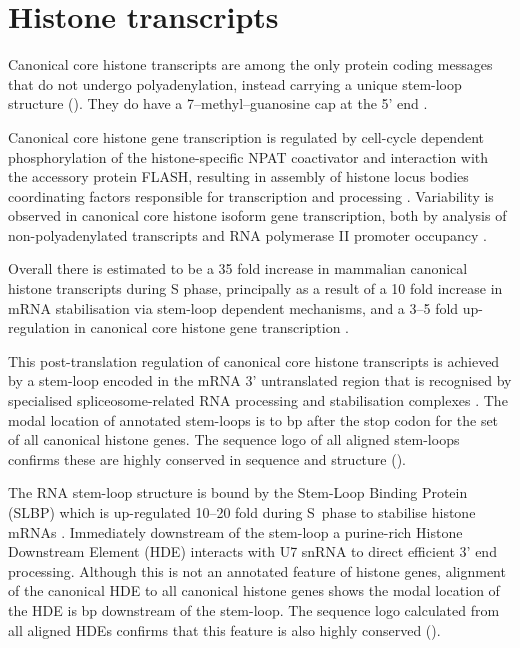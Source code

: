 \section{Histone transcripts}

  Canonical core histone transcripts are among the only protein coding messages
  that do not undergo polyadenylation,
  instead carrying a unique stem-loop structure ().
  They do have a 7--methyl--guanosine cap at the 5' end \citep{MarzluffNatRevGen2008}.

  Canonical core histone gene transcription is regulated
  by cell-cycle dependent phosphorylation of the histone-specific NPAT coactivator
  and interaction with the accessory protein FLASH,
  resulting in assembly of histone locus bodies
  coordinating factors responsible for transcription and processing
  \citep{MarzluffNatRevGen2008,RattrayMueller2012,Hoefig2014}.
  Variability is observed in canonical core histone isoform gene transcription,
  both by analysis of non-polyadenylated transcripts \citep{YangGenomeBiol2011}
  and RNA polymerase II promoter occupancy \citep{Ederveen2011}.

  Overall there is estimated to be a 35 fold increase in mammalian
  canonical histone transcripts during S phase,
  principally as a result of a 10 fold increase in mRNA stabilisation
  via stem-loop dependent mechanisms,
  and a 3--5 fold up-regulation in canonical core histone gene transcription \citep{HarrisMCB1991}.

  This post-translation regulation of canonical core histone transcripts
  is achieved by a stem-loop encoded in the mRNA 3' untranslated region
  that is recognised by specialised spliceosome-related RNA
  processing and stabilisation complexes \citep{stem-loop-structure}.
  The modal location of annotated stem-loops is \StemLoopStart{} to \StemLoopEnd{} bp after the stop codon
  for the set of all canonical histone genes.
  The sequence logo of all aligned stem-loops
  confirms these are highly conserved in sequence and structure ().

  The RNA stem-loop structure is bound by the Stem-Loop Binding Protein (SLBP)
  which is up-regulated 10--20 fold during S~phase to stabilise
  histone mRNAs \citep{SLBP-regulation}.
  Immediately downstream of the stem-loop a purine-rich Histone Downstream Element (HDE)
  interacts with U7 snRNA to direct efficient 3' end processing.
  Although this is not an annotated feature of histone genes,
  alignment of the canonical HDE \citep{HDE-sequence} to all canonical histone genes
  shows the modal location of the HDE is 
  \HDEsDistanceFromStemLoop{} bp downstream of the stem-loop.
  The sequence logo calculated from all aligned HDEs 
  confirms that this feature is also highly conserved ().


